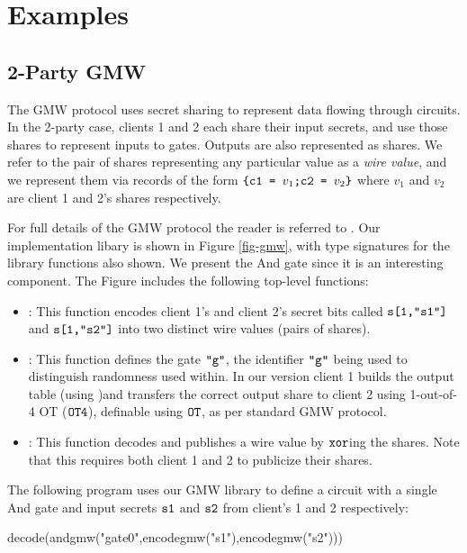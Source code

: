 \section{Examples}
\label{section-examples}

\subsection{2-Party GMW}
\label{section-metalang-gmw}



The GMW protocol uses secret sharing to represent data flowing through
circuits. In the 2-party case, clients 1 and 2 each share their input
secrets, and use those shares to represent inputs to gates. Outputs
are also represented as shares. We refer to the pair of shares
representing any particular value as a \emph{wire value}, and
we represent them via records of the form
$
\texttt{\{c1 = } v_1\texttt{;c2 = } v_2\texttt{\}} 
$
where $v_1$ and $v_2$ are client 1 and 2's shares respectively.

For full details of the GMW protocol the reader is referred to
\cite{evans2018pragmatic}. Our implementation libary is shown in
Figure \ref{fig-gmw}, with type signatures for the library functions
also shown. We present the And gate since it is
an interesting component. The Figure includes the
following top-level functions:
\begin{itemize}
\item {}: This function encodes client 1's and client 2's
  secret bits called $\texttt{s[1,"s1"]}$ and $\texttt{s[1,"s2"]}$ into two
  distinct wire values (pairs of shares).
\item {}: This function defines the gate $\texttt{"g"}$, the
  identifier $\texttt{"g"}$ being used to distinguish randomness used
  within.  In our version client 1 builds the output table (using
  )and transfers the correct output share to client 2
  using 1-out-of-4 OT ($\texttt{OT4}$), definable using $\texttt{OT}$, as
  per standard GMW protocol.
\item {}: This function decodes and publishes a wire value
  by $\texttt{xor}$ing the shares. Note that this requires both client 1
  and 2 to publicize their shares.
\end{itemize}
\begin{example}
  \label{example-gmw-andcircuit}
The following program uses our GMW library to define
a circuit with a single And gate and input secrets $\texttt{s1}$ and
$\texttt{s2}$ from client's 1 and 2 respectively:
\begin{verbatimtab}
decode(andgmw("gate0",encodegmw("s1"),encodegmw("s2")))
\end{verbatimtab}
\end{example}

